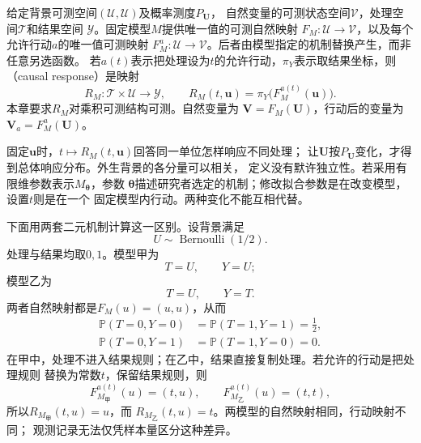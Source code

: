 \begin{definition}
  \label{def:causal-response-interface}
  给定背景可测空间\((\mathcal U,\mathscr U)\)及概率测度\(P_{\bm U}\)，
  自然变量的可测状态空间\(\mathcal V\)，处理空间\(\mathcal T\)和结果空间
  \(\mathcal Y\)。固定模型\(M\)提供唯一值的可测自然映射
  \(F_M:\mathcal U\to\mathcal V\)，以及每个允许行动\(a\)的唯一值可测映射
  \(F_M^a:\mathcal U\to\mathcal V\)。后者由模型指定的机制替换产生，而非任意另选函数。
  若\(a(t)\)表示把处理设为\(t\)的允许行动，\(\pi_Y\)表示取结果坐标，则
  （causal response）是映射
  \begin{equation}
    R_M:\mathcal T\times\mathcal U\longrightarrow\mathcal Y,
    \qquad
    R_M(t,\bm u)=\pi_Y\bigl(F_M^{a(t)}(\bm u)\bigr).
    \label{eq:causal-response-interface}
  \end{equation}
  本章要求\(R_M\)对乘积可测结构可测。自然变量为
  \(\bm V=F_M(\bm U)\)，行动后的变量为\(\bm V_a=F_M^a(\bm U)\)。
\end{definition}

固定\(\bm u\)时，\(t\mapsto R_M(t,\bm u)\)回答同一单位怎样响应不同处理；
让\(\bm U\)按\(P_{\bm U}\)变化，才得到总体响应分布。外生背景的各分量可以相关，
定义没有默许独立性。若采用有限维参数表示\(M_{\bm\theta}\)，参数
\(\bm\theta\)描述研究者选定的机制；修改拟合参数是在改变模型，设置\(t\)则是在一个
固定模型内行动。两种变化不能互相代替。

下面用两套二元机制计算这一区别。设背景满足
\[
  U\sim\operatorname{Bernoulli}(1/2).
\]
处理与结果均取\(0,1\)。模型甲为
\begin{equation}
  T=U,\qquad Y=U;
  \label{eq:causal-observational-equivalence-confounding}
\end{equation}
模型乙为
\begin{equation}
  T=U,\qquad Y=T.
  \label{eq:causal-observational-equivalence-effect}
\end{equation}
两者自然映射都是\(F_M(u)=(u,u)\)，从而
\[
  \begin{aligned}
    \mathbb P(T=0,Y=0)&=\mathbb P(T=1,Y=1)=\frac12,\\
    \mathbb P(T=0,Y=1)&=\mathbb P(T=1,Y=0)=0.
  \end{aligned}
\]
在甲中，处理不进入结果规则；在乙中，结果直接复制处理。若允许的行动是把处理规则
替换为常数\(t\)，保留结果规则，则
\[
  F_{M_{\text{甲}}}^{a(t)}(u)=(t,u),\qquad
  F_{M_{\text{乙}}}^{a(t)}(u)=(t,t),
\]
所以\(R_{M_{\text{甲}}}(t,u)=u\)，而
\(R_{M_{\text{乙}}}(t,u)=t\)。两模型的自然映射相同，行动映射不同；
观测记录无法仅凭样本量区分这种差异。

